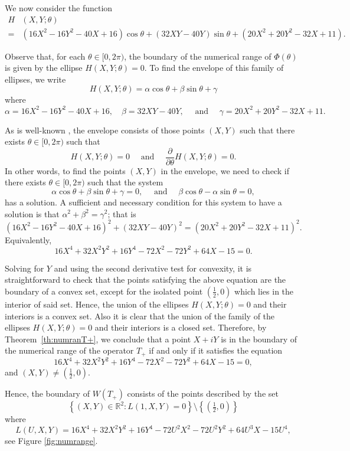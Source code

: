 \documentclass[12pt,reqno]{amsart}
\theoremstyle{definition}
\begin{document}
We now consider the function
\begin{align*}
H&(X,Y;\theta) \\
=& (16 X^2-16 Y^2 - 40 X +16 )\cos \theta + (32 X Y -40 Y)  \sin \theta + (20 X^2 + 20 Y^2 - 32 X + 11).
\end{align*}

Observe that, for each $\theta \in [0, 2 \pi)$, the boundary of the numerical range of $\Phi(\theta)$ is given by the ellipse $H(X,Y;\theta)=0$. To find the envelope of this family of ellipses, we write
\[
H(X,Y;\theta) = \alpha \cos \theta + \beta \sin \theta + \gamma
\]
where
\[
\alpha = 16 X^2-16 Y^2 - 40 X +16, \quad \beta=32 X Y -40 Y, \quad \text{ and } \quad \gamma=20 X^2 + 20 Y^2 - 32 X + 11.
\]

As is well-known \cite[p. 76]{BG}, the envelope consists of those points $(X,Y)$ such that there exists $\theta \in [0,2 \pi)$ such that
\[
H(X,Y;\theta)=0 \quad \text{ and } \quad \frac{\partial}{\partial \theta} H(X,Y;\theta)=0.
\]
In other words, to find the points $(X,Y)$ in the envelope, we need to check if there exists $\theta \in [0, 2 \pi)$ such that the system
\[
\alpha \cos \theta + \beta \sin \theta + \gamma =0, \quad \text{ and } \quad 
\beta \cos \theta - \alpha \sin \theta = 0,
\]
has a solution. A sufficient and necessary condition for this system to have  a solution is that $\alpha^2 + \beta^2 = \gamma^2$; that is
\[
(16 X^2-16 Y^2 - 40 X +16)^2+(32 X Y -40 Y)^2 =(20 X^2 + 20 Y^2 - 32 X + 11)^2.
\]
Equivalently,
\begin{equation}\label{eq:quartic}
    16X^4 +32X^2 Y^2 +16Y^4 -72 X^2 -72  Y^2 +64 X-15=0.
\end{equation}

Solving for $Y$ and using the second derivative test for convexity, it is straightforward to check that the points satisfying the above equation are the boundary of a convex set, except for the isolated point $(\frac12,0)$ which lies in the interior of said set. Hence, the union of the ellipses $H(X,Y;\theta)=0$ and their interiors is a convex set. Also it is clear that the union of the family of the ellipses $H(X,Y;\theta)=0$ and their interiors is a closed set. Therefore, by Theorem~\ref{th:numranT+}, we conclude that a point $X + i Y$ is in the boundary of the numerical range of the operator $T_+$ if and only if it satisfies the equation
\[
16X^4 +32X^2 Y^2 +16Y^4 -72 X^2 -72  Y^2 +64 X-15=0,
\]
and $(X,Y)\neq (\frac{1}{2},0)$.

Hence, the boundary of $W(T_+)$ consists of the points described by the set
\[
\left\{ (X, Y) \in {\mathbb R}^2: L(1, X, Y)=0 \right\} \setminus \left\{ (\tfrac{1}{2},0) \right\}
\]
where 
\begin{equation}\label{eq:L}
L(U, X, Y)=16X^4 +32X^2 Y^2 +16Y^4 -72U^2 X^2 -72 U^2 Y^2 +64U^3 X-15 U^4,
\end{equation}
see Figure \ref{fig:numrange}.
\end{document}

